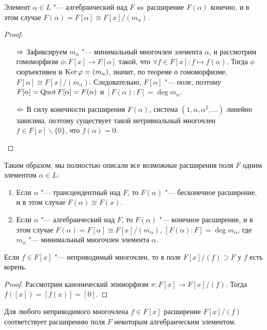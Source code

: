 \begin{theorem}
	Элемент $\alpha \in L$ "--- алгебраический над $F$ $\Leftrightarrow$ расширение $F(\alpha)$ конечно, и в этом случае $F(\alpha) = F[\alpha] \cong F[x]/(m_\alpha)$.
\end{theorem}

\begin{proof}~
	\begin{itemize}
		\item[$\Rightarrow$] Зафиксируем $m_\alpha$ "--- минимальный многочлен элемента $\alpha$, и рассмотрим гомоморфизм $\phi: F[x] \to F[\alpha]$ такой, что $\forall f \in F[x]: f \mapsto f(\alpha)$. Тогда $\phi$ сюръективен и $\operatorname{Ker}\varphi = (m_\alpha)$, значит, по теореме о гомоморфизме, $F[\alpha] \cong F[x] / (m_\alpha)$. Следовательно, $F[\alpha]$ "--- поле, поэтому $F[\alpha] = \operatorname{Quot} F[\alpha] = F(\alpha)$ и $[F(\alpha) : F] = \deg{m_\alpha}$.
		
		\item[$\Leftarrow$] В силу конечности расширения $F(\alpha)$, система $(1, \alpha, \alpha^2, \dotsc)$ линейно зависима, поэтому существует такой нетривиальный многочлен $f \in F[x] \backslash \{0\}$, что $f(\alpha) = 0$.\qedhere
	\end{itemize}
\end{proof}

\begin{note}
	Таким образом, мы полностью описали все возможные расширения поля $F$ одним элементом $\alpha \in L$:
	\begin{enumerate}
		\item Если $\alpha$ "--- трансцендентный над $F$, то $F(\alpha)$ "--- бесконечное расширение, и в этом случае $F(\alpha) \cong F(x)$.
		\item Если $\alpha$ "--- алгебраический над $F$, то $F(\alpha)$ "--- конечное расширение, и в этом случае $F(\alpha) = F[\alpha]  \cong F[x] / (m_\alpha)$, $[F(\alpha) : F] = \deg{m_\alpha}$, где $m_\alpha$ "--- минимальный многочлен элемента $\alpha$.
	\end{enumerate}
\end{note}

\begin{proposition}
	Если $f \in F[x]$ "--- неприводимый многочлен, то в поле $F[x] / (f) \supset F$ у $f$ есть корень.
\end{proposition}

\begin{proof}
	Рассмотрим канонический эпиморфизм $\pi: F[x] \to F[x] / (f)$. Тогда $f([x]) = [f(x)] = [0]$.
\end{proof}

\begin{corollary}
	Для любого неприводимого многочлена $f \in F[x]$ расширение $F[x] / (f)$ соответствует расширению поля $F$ некоторым алгебраическим элементом.
\end{corollary}